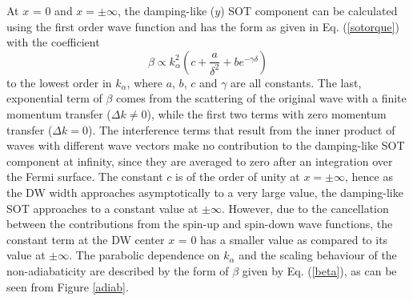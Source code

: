 \documentclass[12pt]{iopart}
\begin{document}
At $x$ = 0 and $x = \pm \infty$, the damping-like ($y$) SOT component can be calculated using the first order wave function and has the form as given in Eq. (\ref{sotorque}) with the coefficient
\begin{equation}
\beta \propto k_ \alpha ^2 \left( c + \frac {a} {\delta^2} + b e^ {-\gamma \delta} \right)
\label{beta}
\end{equation}
to the lowest order in $k_ \alpha$, where $a$, $b$, $c$ and $\gamma$ are all constants. The last, exponential term of $\beta$ comes from the scattering of the original wave with a finite momentum transfer ($\Delta k \neq 0$), while the first two terms with zero momentum transfer ($\Delta k = 0$). The interference terms that result from the inner product of waves with different wave vectors make no contribution to the damping-like SOT component at infinity, since they are averaged to zero after an integration over the Fermi surface. The constant $c$ is of the order of unity at $ x = \pm \infty$, hence as the DW width approaches asymptotically to a very large value, the damping-like SOT approaches to a constant value at $\pm \infty$. However, due to the cancellation between the contributions from the spin-up and spin-down wave functions, the constant term at the DW center $x$ = 0 has a smaller value as compared to its value at $\pm \infty$. The parabolic dependence on $k_ \alpha$ and the scaling behaviour of the non-adiabaticity are described by the form of $\beta$ given by Eq. (\ref{beta}), as can be seen from Figure \ref{adiab}.
\end{document}
